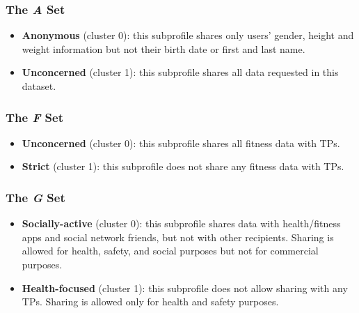 \subsubsection{The \textit{A} Set}
\begin{itemize}
	\item \textbf{Anonymous} (cluster 0): this subprofile shares only users' gender, height and weight information but not their birth date or first and last name.
	
	\item \textbf{Unconcerned} (cluster 1): this subprofile shares all data requested in this dataset.
\end{itemize}

\subsubsection{The \textit{F} Set}
\begin{itemize}
	\item \textbf{Unconcerned} (cluster 0): this subprofile shares all fitness data with TPs.
	
	\item \textbf{Strict} (cluster 1): this subprofile does not share any fitness data with TPs.
\end{itemize}


\subsubsection{The \textit{G} Set}
\begin{itemize}
	\item \textbf{Socially-active} (cluster 0): this subprofile shares data with health/fitness apps and social network friends, but not with other recipients. %
	Sharing is allowed for health, safety, and social purposes but not for commercial purposes.
	
	\item \textbf{Health-focused} (cluster 1): this subprofile does not allow sharing with any TPs. Sharing is allowed only for health and safety purposes. 
\end{itemize}

